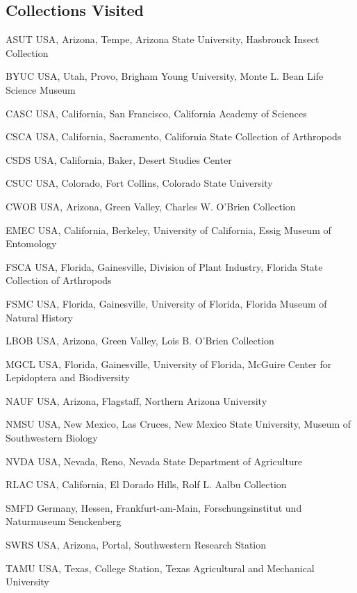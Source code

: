 \documentclass[12pt,a4paper]{article}
\begin{document}
	\subsection*{Collections Visited}
		\begin{collections}
			\item [ASUT] USA, Arizona, Tempe, Arizona State University, Hasbrouck Insect Collection
			\item [BYUC] USA, Utah, Provo, Brigham Young University, Monte L. Bean Life Science Museum
			\item [CASC] USA, California, San Francisco, California Academy of Sciences
			\item [CSCA] USA, California, Sacramento, California State Collection of Arthropods
			\item [CSDS] USA, California, Baker, Desert Studies Center
			\item [CSUC] USA, Colorado, Fort Collins, Colorado State University
			\item [CWOB] USA, Arizona, Green Valley, Charles W. O'Brien Collection
			\item [EMEC] USA, California, Berkeley, University of California, Essig Museum of Entomology
			\item [FSCA] USA, Florida, Gainesville, Division of Plant Industry, Florida State Collection of Arthropods
			\item [FSMC] USA, Florida, Gainesville, University of Florida, Florida Museum of Natural History
			\item [LBOB] USA, Arizona, Green Valley, Lois B. O'Brien Collection
			\item [MGCL] USA, Florida, Gainesville, University of Florida, McGuire Center for Lepidoptera and Biodiversity
			\item [NAUF] USA, Arizona, Flagstaff, Northern Arizona University
			\item [NMSU] USA, New Mexico, Las Cruces, New Mexico State University, Museum of Southwestern Biology
			\item [NVDA] USA, Nevada, Reno, Nevada State Department of Agriculture
			\item [RLAC] USA, California, El Dorado Hills, Rolf L. Aalbu Collection
			\item [SMFD] Germany, Hessen, Frankfurt-am-Main, Forschungsinstitut und Naturmuseum Senckenberg
			\item [SWRS] USA, Arizona, Portal, Southwestern Research Station
			\item [TAMU] USA, Texas, College Station, Texas Agricultural and Mechanical University

\end{collections}
\end{document}
